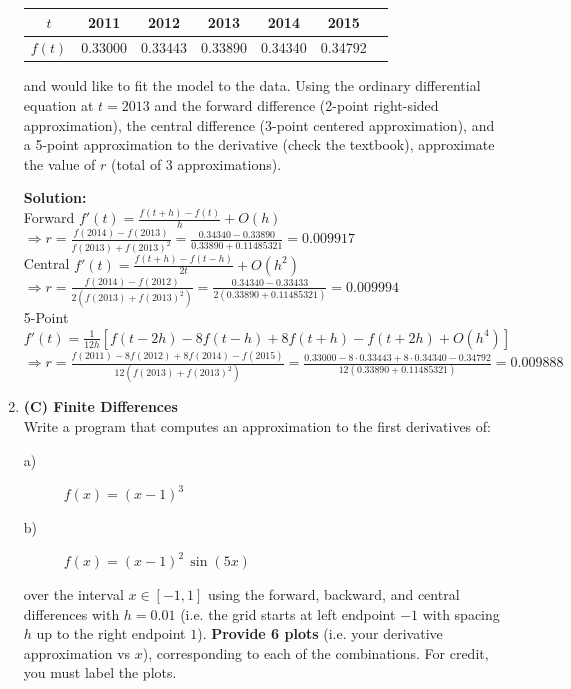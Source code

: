 \documentclass[12pt]{article}
\begin{document}
\begin{enumerate}[label=\bfseries Problem \arabic*:]
 \begin{table}[h]
\centering
{}
 \begin{tabular}{|c|c|c|c|c|c|c|}\hline
 $t$ & 2011 & 2012&  2013 & 2014 & 2015    \\ \hline
$f(t)$ &0.33000  & 0.33443  & 0.33890 & 0.34340 &  0.34792 \\ \hline
\end{tabular}
\end{table}
\medskip
\medskip

\medskip

and would like to fit the model to the data. Using the ordinary differential equation at $t=2013$ and the forward difference (2-point right-sided approximation), the central difference (3-point centered approximation), and a  5-point approximation to the derivative (check the textbook), approximate the value of $r$ (total of 3 approximations).




\vspace{1em}
\textbf{Solution:}\\
Forward $f'(t)=\frac{f(t+h)-f(t)}{h}+O(h)$ $\Rightarrow r=\frac{f(2014)-f(2013)}{f(2013)+f(2013)^2}=\frac{0.34340-0.33890}{0.33890+0.11485321}=0.009917$\\
Central $f'(t)=\frac{f(t+h)-f(t-h)}{2t}+O(h^2)$ $\Rightarrow r=\frac{f(2014)-f(2012)}{2(f(2013)+f(2013)^2)}=\frac{0.34340-0.33433}{2(0.33890+0.11485321)}=0.009994$\\
5-Point $f'(t)=\frac{1}{12h}[f(t-2h)-8f(t-h)+8f(t+h)-f(t+2h)+O(h^4)]$ $\Rightarrow r=\frac{f(2011)-8f(2012)+8f(2014)-f(2015)}{12(f(2013)+f(2013)^2)}=\frac{0.33000-8\cdot0.33443+8\cdot0.34340-0.34792}{12(0.33890+0.11485321)}=0.009888$

\newpage
 
 \item \textbf{(C) Finite Differences}\\
Write a program that computes an approximation to the first derivatives of:
\begin{description}
\item[a)] $f(x)=(x-1)^3$
\item[b)] $f(x)=(x-1)^2 \, \sin(5x)$
\end{description}
over the interval $x\in[-1,1]$ using the forward, backward, and central differences with $h=0.01$ (i.e. the grid starts at left endpoint $-1$ with spacing $h$ up to the right endpoint $1$). \textbf{Provide 6 plots} (i.e. your derivative approximation vs $x$), corresponding to each of the combinations. For credit, you must label the plots. 


\end{enumerate}
\end{document}
